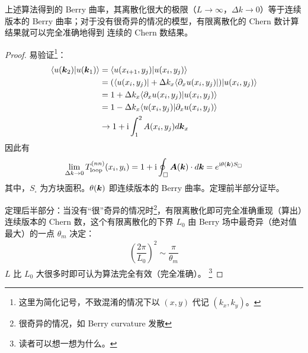 \begin{theorem}
上述算法得到的 Berry 曲率，其离散化很大的极限（$L\rightarrow\infty$，$\Delta k\rightarrow0$）等于连续版本的 Berry 曲率；对于没有很奇异的情况的模型，有限离散化的 Chern 数计算结果就可以完全准确地得到 连续的 Chern 数结果。
\end{theorem}

\begin{proof}
易验证\footnote{这里为简化记号，不致混淆的情况下以 $(x,y)$ 代记 $(k_x,k_y)$。}：
\begin{align}
\langle u(\boldsymbol{k}_2)|u(\boldsymbol{k}_1)\rangle 
&= \langle u(x_{i+1},y_j)|u(x_i,y_j)\rangle \\ 
&= (\langle u(x_i,y_j)| + \Delta k_x\langle\partial_xu(x_i,y_j)|)|u(x_i,y_j)\rangle \\ 
&= 1 + \Delta k_x \langle\partial_xu(x_i,y_j)|u(x_i,y_j)\rangle \\ 
&= 1 - \Delta k_x \langle u(x_i,y_j)|\partial_xu(x_i,y_j)\rangle \\
&\rightarrow 1 + \mathrm{i} \int_1^2A(x_i,y_j)d\boldsymbol{k}_x
\end{align}
因此有
\begin{align}
\lim_{\Delta k\rightarrow0} T_{\text{loop}}^{(nn)}(x_i,y_i) = 
1 + \mathrm{i} \oint_{\square} \boldsymbol{A}(\boldsymbol{k})\cdot d\boldsymbol{k} = e^{\mathrm{i}\theta(\boldsymbol{k}) S_{\square}} 
\end{align}
其中，$S_{\square}$ 为方块面积。$\theta(\boldsymbol{k})$ 即连续版本的 Berry 曲率。定理前半部分证毕。

定理后半部分：当没有“很”奇异的情况时\footnote{很奇异的情况，如 Berry curvature 发散}，有限离散化即可完全准确重现（算出）连续版本的 Chern 数，这个有限离散化的下界 $L_0$ 由 Berry 场中最奇异（绝对值最大）的一点 $\theta_m$ 决定：
\begin{align}
\left(\dfrac{2\pi}{L_0}\right)^2 \sim \dfrac{\pi}{\theta_{m}}
\end{align}
$L$ 比 $L_0$ 大很多时即可认为算法完全有效（完全准确）。
\footnote{读者可以想一想为什么。}
\end{proof}







